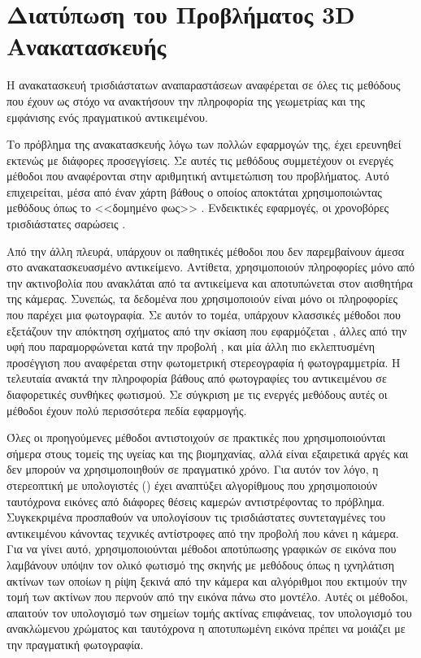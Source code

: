 \section{Διατύπωση του Προβλήματος 3D Ανακατασκευής}
\label{section:problem_description}

\par
    Η ανακατασκευή τρισδιάστατων αναπαραστάσεων αναφέρεται σε όλες τις μεθόδους που έχουν ως στόχο να ανακτήσουν την πληροφορία της γεωμετρίας και της εμφάνισης ενός  πραγματικού αντικειμένου.
\par
    Το πρόβλημα της  ανακατασκευής λόγω των πολλών εφαρμογών της, έχει ερευνηθεί εκτενώς με διάφορες προσεγγίσεις. Σε αυτές τις μεθόδους συμμετέχουν οι ενεργές μέθοδοι που αναφέρονται στην αριθμητική αντιμετώπιση του προβλήματος. Αυτό επιχειρείται, μέσα από έναν χάρτη βάθους  ο οποίος αποκτάται χρησιμοποιώντας μεθόδους όπως το <<δομημένο φως>> . Ενδεικτικές εφαρμογές, οι χρονοβόρες τρισδιάστατες σαρώσεις  .
\par
    Από την άλλη πλευρά, υπάρχουν οι παθητικές μέθοδοι που δεν παρεμβαίνουν άμεσα στο ανακατασκευασμένο αντικείμενο. Αντίθετα, χρησιμοποιούν πληροφορίες μόνο από την ακτινοβολία που ανακλάται από τα αντικείμενα και αποτυπώνεται στον αισθητήρα της κάμερας. Συνεπώς, τα δεδομένα που χρησιμοποιούν είναι μόνο οι πληροφορίες που παρέχει μια φωτογραφία. Σε αυτόν το τομέα, υπάρχουν κλασσικές μέθοδοι που εξετάζουν την απόκτηση  σχήματος από την σκίαση που εφαρμόζεται , άλλες από την υφή που παραμορφώνεται κατά την προβολή , και μία άλλη πιο εκλεπτυσμένη προσέγγιση που αναφέρεται στην φωτομετρική στερεογραφία ή φωτογραμμετρία. Η τελευταία ανακτά την πληροφορία βάθους από φωτογραφίες του αντικειμένου σε διαφορετικές συνθήκες φωτισμού. Σε σύγκριση με τις ενεργές μεθόδους αυτές οι μέθοδοι έχουν πολύ περισσότερα πεδία εφαρμογής.
\par 
    Όλες οι προηγούμενες μέθοδοι αντιστοιχούν σε πρακτικές που χρησιμοποιούνται σήμερα στους τομείς της υγείας και της βιομηχανίας, αλλά είναι εξαιρετικά αργές και δεν μπορούν να χρησιμοποιηθούν σε πραγματικό χρόνο. Για αυτόν τον λόγο, η στερεοπτική με υπολογιστές  () έχει αναπτύξει αλγορίθμους που χρησιμοποιούν ταυτόχρονα εικόνες από διάφορες θέσεις καμερών αντιστρέφοντας το πρόβλημα. Συγκεκριμένα προσπαθούν να υπολογίσουν τις τρισδιάστατες συντεταγμένες του αντικειμένου κάνοντας τεχνικές αντίστροφες από την προβολή που κάνει η κάμερα. Για να γίνει αυτό, χρησιμοποιούνται μέθοδοι  αποτύπωσης γραφικών σε εικόνα που λαμβάνουν υπόψιν τον ολικό φωτισμό της σκηνής με μεθόδους όπως η ιχνηλάτιση ακτίνων των οποίων η ρίψη ξεκινά από την κάμερα και αλγόριθμοι που εκτιμούν την τομή των ακτίνων που περνούν από την εικόνα πάνω στο  μοντέλο. Αυτές οι μέθοδοι, απαιτούν τον υπολογισμό των σημείων τομής ακτίνας επιφάνειας, τον υπολογισμό του ανακλώμενου χρώματος και ταυτόχρονα η αποτυπωμένη εικόνα πρέπει να μοιάζει με την πραγματική φωτογραφία.
 

